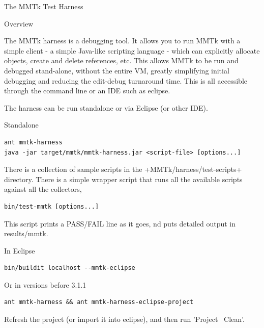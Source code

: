 \begin{chapter}{The MMTk Test Harness}
\label{cha:themmtktestharness}

\begin{section}{Overview}

The MMTk harness is a debugging tool. It allows you to run MMTk with a simple client - a simple Java-like scripting language - which can explicitly allocate objects, create and delete references, etc. This allows MMTk to be run and debugged stand-alone, without the entire VM, greatly simplifying initial debugging and reducing the edit-debug turnaround time. This is all accessible through the command line or an IDE such as eclipse.

The harness can be run standalone or via Eclipse (or other IDE).

\end{section}

\begin{section}{Standalone}

\begin{lstlisting}
ant mmtk-harness
java -jar target/mmtk/mmtk-harness.jar <script-file> [options...]
\end{lstlisting}

There is a collection of sample scripts in the \spverb+MMTk/harness/test-scripts+ directory.  There is a simple wrapper script that runs all the available scripts against all the collectors,

\begin{lstlisting}
bin/test-mmtk [options...]
\end{lstlisting}

This script prints a PASS/FAIL line as it goes, nd puts detailed output in results/mmtk.

\end{section}

\begin{section}{In Eclipse}

\begin{lstlisting}
bin/buildit localhost --mmtk-eclipse
\end{lstlisting}

Or in versions before 3.1.1

\begin{lstlisting}
ant mmtk-harness && ant mmtk-harness-eclipse-project
\end{lstlisting}

Refresh the project (or import it into eclipse), and then run 'Project \textrightarrow\ Clean'.


\end{section}
\end{chapter}

